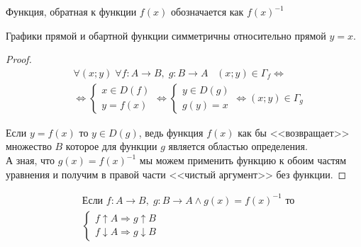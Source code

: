 \begin{definition}
    Функция, обратная к функции $f(x)$ обозначается как $f(x)^{-1}$ 
\end{definition}

\begin{theorem}
    Графики прямой и обартной функции симметричны относительно прямой $y = x$.
\end{theorem}

\begin{proof}
    \begin{align*}
        &\forall (x; y) \; \forall f: A \rightarrow B, \; g: B \rightarrow A \;\;\; (x; y) \in \Gamma_f \iff \\
        &\iff  \left\{\begin{array}{l}
            x \in D(f) \\
            y = f(x)
        \end{array}\right. \iff
        \left\{\begin{array}{l}
            y \in D(g) \\
            g(y) = x 
        \end{array}\right. \iff
        (x; y) \in \Gamma_g
    \end{align*}

    Если $y = f(x)$ то $y \in D(g)$, ведь функция $f(x)$ как бы <<возвращает>> множество $B$ которое для функции $g$ является областью определения. \\
    А зная, что $g(x) = f(x)^{-1}$ мы можем применить функцию к обоим частям уравнения и получим в правой части <<чистый аргумент>> без функции.
\end{proof}

\break

\begin{theorem}
    \begin{align*}
        &\text{Если } f: A \rightarrow B, \; g: B \rightarrow A \land g(x) = f(x)^{-1} \text{ то} \\
        &\left\{\begin{array}{l}
            f \uparrow A \Rightarrow g \uparrow B \\
            f \downarrow A \Rightarrow g \downarrow B
        \end{array}\right.
    \end{align*}
\end{theorem}


